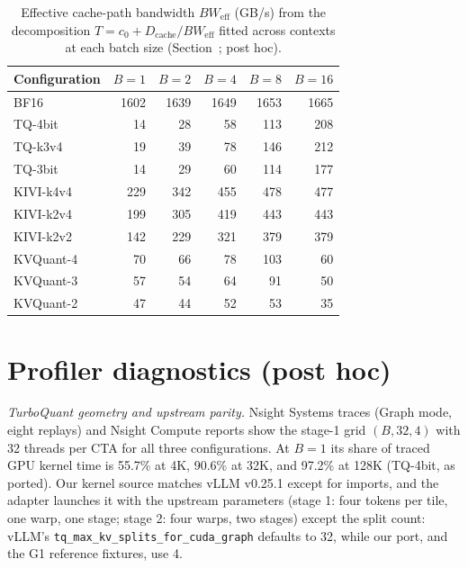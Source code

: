 \begin{table}[t]
\caption{Effective cache-path bandwidth $BW_{\mathrm{eff}}$ (GB/s) from the decomposition $T = c_0 + D_{\mathrm{cache}} / BW_{\mathrm{eff}}$ fitted across contexts at each batch size (Section~; post hoc).}
\label{tab:bweff}
\vskip 0.1in
\centering
\footnotesize
\setlength{\tabcolsep}{4pt}
\begin{tabular}{@{}lrrrrr@{}}
\toprule
Configuration & $B=1$ & $B=2$ & $B=4$ & $B=8$ & $B=16$ \\
\midrule
BF16 & 1602 & 1639 & 1649 & 1653 & 1665 \\
TQ-4bit\ported{} & 14 & 28 & 58 & 113 & 208 \\
TQ-k3v4\ported{} & 19 & 39 & 78 & 146 & 212 \\
TQ-3bit\ported{} & 14 & 29 & 60 & 114 & 177 \\
KIVI-k4v4 & 229 & 342 & 455 & 478 & 477 \\
KIVI-k2v4 & 199 & 305 & 419 & 443 & 443 \\
KIVI-k2v2 & 142 & 229 & 321 & 379 & 379 \\
KVQuant-4 & 70 & 66 & 78 & 103 & 60 \\
KVQuant-3 & 57 & 54 & 64 & 91 & 50 \\
KVQuant-2 & 47 & 44 & 52 & 53 & 35 \\
\bottomrule
\end{tabular}
\end{table}

\section{Profiler diagnostics (post hoc)}
\label{app:diagnostics}

\textit{TurboQuant geometry and upstream parity.}
Nsight Systems traces (Graph mode, eight replays) and Nsight Compute reports show the stage-1 grid $(B, 32, 4)$ with 32 threads per CTA for all three configurations.
At $B = 1$ its share of traced GPU kernel time is 55.7\% at 4K, 90.6\% at 32K, and 97.2\% at 128K (TQ-4bit, as ported).
Our kernel source matches vLLM v0.25.1 except for imports, and the adapter launches it with the upstream parameters (stage 1: four tokens per tile, one warp, one stage; stage 2: four warps, two stages) except the split count: vLLM's \texttt{tq\_max\_kv\_splits\_for\_cuda\_graph} defaults to 32, while our port, and the G1 reference fixtures, use 4.

